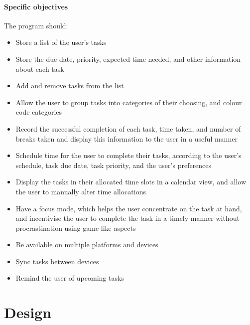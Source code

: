 \documentclass{article}
\begin{document}
\subsection{Specific objectives}
The program should:

\begin{itemize}
	\item Store a list of the user's tasks
	\item Store the due date, priority, expected time needed, and other information
	      about each task
	\item Add and remove tasks from the list
	\item Allow the user to group tasks into categories of their choosing, and
	      colour code categories
	\item Record the successful completion of each task, time taken, and number of
	      breaks taken and display this information to the user in a useful manner
	\item Schedule time for the user to complete their tasks, according to the
	      user's schedule, task due date, task priority, and the user's preferences
	\item Display the tasks in their allocated time slots in a calendar view, and
	      allow the user to manually alter time allocations
	\item Have a focus mode, which helps the user concentrate on the task at hand,
	      and incentivise the user to complete the task in a timely manner without
	      procrastination using game-like aspects
	\item Be available on multiple platforms and devices
	\item Sync tasks between devices
	\item Remind the user of upcoming tasks
\end{itemize}


\part{Design}
\end{document}
